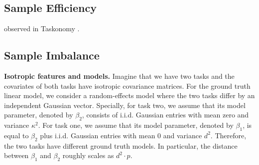 
\subsection{Sample Efficiency}

observed in Taskonomy \cite{ZSSGM18}.


\subsection{Sample Imbalance}

\noindent\textbf{Isotropic features and models.}
	Imagine that we have two tasks and the covariates of both tasks have isotropic covariance matrices.
	For the ground truth linear model, we consider a random-effects model where the two tasks differ by an independent Gaussian vector.
	Specially, for task two, we assume that its model parameter, denoted by $\beta_2$, consists of i.i.d. Gaussian entries with mean zero and variance $\kappa^2$.
	For task one, we assume that its model parameter, denoted by $\beta_1$, is equal to $\beta_2$ plus i.i.d. Gaussian entries with mean $0$ and variance $d^2$.
	Therefore, the two tasks have different ground truth models. In particular, the distance between $\beta_1$ and $\beta_2$ roughly scales as $d^2 \cdot p$.

\begin{example}
\end{example}


